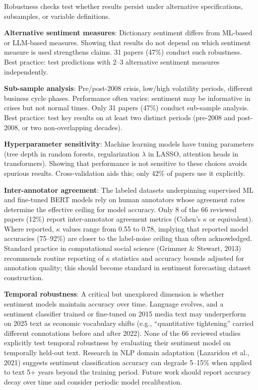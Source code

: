 \documentclass[11pt,twocolumn]{article}
\begin{document}
Robustness checks test whether results persist under alternative specifications, subsamples, or variable definitions.

\textbf{Alternative sentiment measures}: Dictionary sentiment differs from ML-based or LLM-based measures. Showing that results do not depend on which sentiment measure is used strengthens claims. 31 papers (47\%) conduct such robustness. Best practice: test predictions with 2--3 alternative sentiment measures independently.

\textbf{Sub-sample analysis}: Pre/post-2008 crisis, low/high volatility periods, different business cycle phases. Performance often varies: sentiment may be informative in crises but not normal times. Only 31 papers (47\%) conduct sub-sample analysis. Best practice: test key results on at least two distinct periods (pre-2008 and post-2008, or two non-overlapping decades).

\textbf{Hyperparameter sensitivity}: Machine learning models have tuning parameters (tree depth in random forests, regularization $\lambda$ in LASSO, attention heads in transformers). Showing that performance is not sensitive to these choices avoids spurious results. Cross-validation aids this; only 42\% of papers use it explicitly.

\textbf{Inter-annotator agreement}: The labeled datasets underpinning supervised ML and fine-tuned BERT models rely on human annotators whose agreement rates determine the effective ceiling for model accuracy. Only 8 of the 66 reviewed papers (12\%) report inter-annotator agreement metrics (Cohen's $\kappa$ or equivalent). Where reported, $\kappa$ values range from 0.55 to 0.78, implying that reported model accuracies (75--92\%) are closer to the label-noise ceiling than often acknowledged. Standard practice in computational social science (Grimmer \& Stewart, 2013) recommends routine reporting of $\kappa$ statistics and accuracy bounds adjusted for annotation quality; this should become standard in sentiment forecasting dataset construction.

\textbf{Temporal robustness}: A critical but unexplored dimension is whether sentiment models maintain accuracy over time. Language evolves, and a sentiment classifier trained or fine-tuned on 2015 media text may underperform on 2025 text as economic vocabulary shifts (e.g., ``quantitative tightening'' carried different connotations before and after 2022). None of the 66 reviewed studies explicitly test temporal robustness by evaluating their sentiment model on temporally held-out text. Research in NLP domain adaptation (Lazaridou et al., 2021) suggests sentiment classification accuracy can degrade 5--15\% when applied to text 5+ years beyond the training period. Future work should report accuracy decay over time and consider periodic model recalibration.
\end{document}
